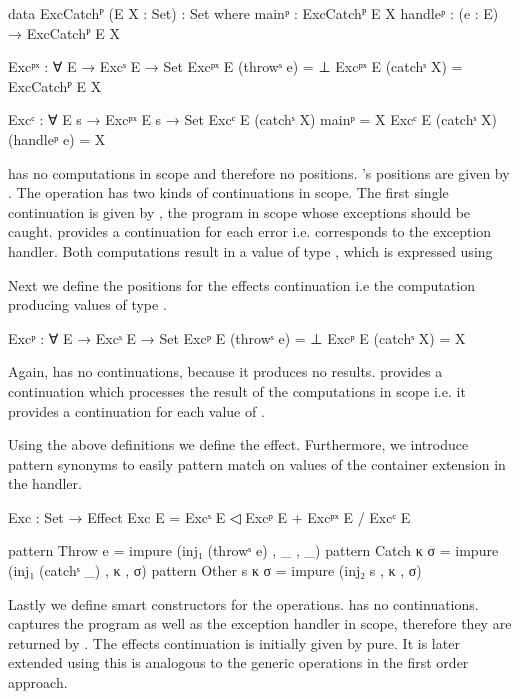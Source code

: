 \begin{code}
data ExcCatchᴾ (E X : Set) : Set where
  mainᵖ    : ExcCatchᴾ E X
  handleᵖ  : (e : E) → ExcCatchᴾ E X

Excᵖˣ : ∀ E → Excˢ E → Set
Excᵖˣ E (throwˢ e)  = ⊥
Excᵖˣ E (catchˢ X)  = ExcCatchᴾ E X

Excᶜ : ∀ E s → Excᵖˣ E s → Set
Excᶜ E (catchˢ X) mainᵖ        = X
Excᶜ E (catchˢ X) (handleᵖ e)  = X
\end{code}
 has no computations in scope and therefore no positions.
's positions are given by .
The operation has two kinds of continuations in scope.
The first single continuation is given by , the
program in scope whose exceptions should be caught.
 provides a continuation for each error i.e.
corresponds to the exception handler.
Both computations result in a value of type , which is expressed
using 

Next we define the positions for the effects continuation i.e the computation
producing values of type .

\begin{code}
Excᵖ : ∀ E → Excˢ E → Set
Excᵖ E (throwˢ e)  = ⊥
Excᵖ E (catchˢ X)  = X
\end{code}
Again,  has no continuations, because it produces no
results.
 provides a continuation which processes the result of the
computations in scope i.e. it provides a continuation for each value of
.

Using the above definitions we define the  effect.
Furthermore, we introduce pattern synonyms to easily pattern match on values of
the container extension in the handler.
\begin{code}
Exc : Set → Effect
Exc E = Excˢ E ◁ Excᵖ E + Excᵖˣ E / Excᶜ E

pattern Throw e      = impure (inj₁ (throwˢ e)  , _ ,  _)
pattern Catch κ σ    = impure (inj₁ (catchˢ _)  , κ ,  σ)
pattern Other s κ σ  = impure (inj₂ s           , κ ,  σ)
\end{code}
Lastly we define smart constructors for the operations.
 has no continuations.
 captures the program as well as the exception handler in
scope, therefore they are returned by .
The effects continuation  is initially given by pure.
It is later extended using \AgdaFunction{>>=} this is analogous to the generic
operations in the first order approach.

